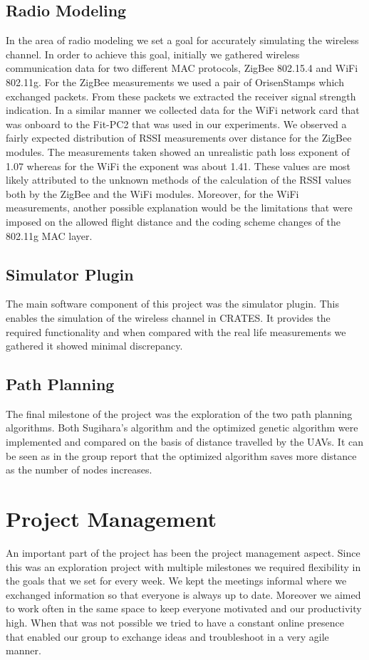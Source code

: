 \subsection{Radio Modeling}
In the area of radio modeling we set a goal for accurately simulating the
wireless channel. In order to achieve this goal, initially we gathered wireless
communication data for two different MAC protocols, ZigBee 802.15.4 and WiFi
802.11g. For the ZigBee measurements we used a pair of OrisenStamps which exchanged
packets. From these packets we extracted the receiver signal strength
indication. In a similar manner we collected data for the WiFi network card that
was onboard to the Fit-PC2 that was used in our experiments. We observed a
fairly expected distribution of RSSI measurements over distance for the ZigBee
modules. The measurements taken showed an unrealistic path loss exponent of 1.07
whereas for the WiFi the exponent was about 1.41. These values are most likely
attributed to the unknown methods of the calculation of the RSSI values both by
the ZigBee and the WiFi modules. Moreover, for the WiFi measurements, another
possible explanation would be the limitations that were imposed on the allowed
flight distance and the coding scheme changes of the 802.11g MAC layer.
\subsection{Simulator Plugin}
The main software component of this project was the simulator plugin. This
enables the simulation of the wireless channel in CRATES. It provides the
required functionality and when compared with the real life measurements we
gathered it showed minimal discrepancy.
\subsection{Path Planning}
The final milestone of the project was the exploration of the two path planning
algorithms. Both Sugihara's algorithm and the optimized genetic algorithm were
implemented and compared on the basis of distance travelled by the UAVs. It can
be seen as in the group report that the optimized algorithm saves more distance
as the number of nodes increases.

\section{Project Management}
An important part of the project has been the project management aspect. Since
this was an exploration project with multiple milestones we required flexibility
in the goals that we set for every week. We kept the meetings informal where we
exchanged information so that everyone is always up to date. Moreover we aimed
to work often in the same space to keep everyone motivated and our productivity
high. When that was not possible we tried to have a constant online presence
that enabled our group to exchange ideas and troubleshoot in a very agile
manner.

